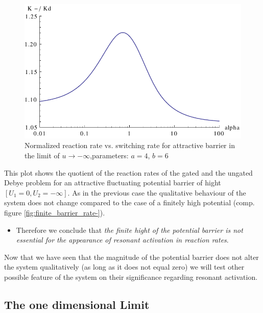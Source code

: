 \begin{minipage}[t]{0.7 \textwidth}
    \begin{figure}[H]
        \includegraphics[width = 1 \textwidth]{plots/K-.pdf}
    \caption{Normalized reaction rate vs. switching rate for \newline attractive barrier in the limit of $u \rightarrow - \infty$,\newline parameters: $a = 4$, $b = 6$}
    \end{figure}
\end{minipage}\begin{minipage}[t]{0.3 \textwidth}
    This plot shows the quotient of the reaction rates of the gated and the ungated Debye problem for an attractive fluctuating potential barrier of hight $[U_1 = 0, U_2 = -\infty]$. As in the previous case the qualitative behaviour of the system does not change compared to the case of a finitely high potential (comp. figure \ref{fig:finite_barrier_rate-}). 
\end{minipage}

\begin{itemize}
    \item Therefore we conclude that \textit{the finite hight of the potential barrier is not essential for the appearance of resonant activation in reaction rates}.
\end{itemize}
Now that we have seen that the magnitude of the potential barrier does not alter the system qualitatively (as long as it does not equal zero) we will test other possible feature of the system on their significance regarding resonant activation. 

\subsection{The one dimensional Limit}

